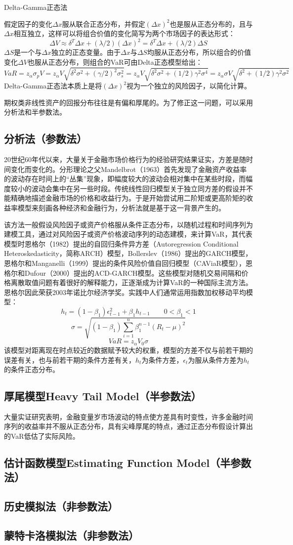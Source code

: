 \documentclass[UTF8]{ctexart}
\newcommand \qd[1] {\begin{qds} {#1} \end{qds}}
\begin{document}
\qd{Delta-Gamma正态法}假定因子的变化$\Delta x$服从联合正态分布，并假定$(\Delta x)^2$也是服从正态分布的，且与$\Delta x$相互独立，这样可以将组合价值的变化简写为两个市场因子的表达形式：
$$\Delta V \approx \delta^T \Delta x+(\lambda /2)(\Delta x)^2= \delta^T \Delta x+(\lambda /2)\Delta S$$
$\Delta S$是一个与$\Delta x$独立的正态变量。由于$\Delta x$与$\Delta S$均服从正态分布，所以组合的价值变化$\Delta V$也服从正态分布，则组合的VaR可由Delta正态模型给出：
$$VaR
=z_{\alpha} \sigma_p V
=z_{\alpha} V \sqrt{\delta^2 \sigma^2+(\gamma /2)^2 \sigma_s^2}
=z_{\alpha} V \sqrt{\delta^2 \sigma^2+(1/2)\gamma^2 \sigma^4}
=z_{\alpha} \sigma V \sqrt{\delta^2 +(1/2)\gamma^2 \sigma^2}$$
Delta-Gamma正态法本质上是将$(\Delta x)^2$视为一个独立的风险因子，以简化计算。

期权类非线性资产的回报分布往往是有偏和厚尾的。为了修正这一问题，可以采用分析法和半参数法。

\subsection{分析法（参数法）}
20世纪60年代以来，大量关于金融市场价格行为的经验研究结果证实，方差是随时间变化而变化的。分形理论之父Mandelbrot（1963）首先发现了金融资产收益率的波动存在时间上的“丛集”现象，即幅度较大的波动会相对集中在某些时段，而幅度较小的波动会集中在另一些时段。传统线性回归模型关于独立同方差的假设并不能精确地描述金融市场的价格和收益行为。于是开始尝试用二阶矩或更高阶矩的收益率模型来刻画各种经济和金融行为，分析法就是基于这一背景产生的。

该方法一般假设风险因子或资产价格服从条件正态分布，以随机过程和时间序列为建模工具，通过对风险因子或资产价格波动序列的动态建模，来计算VaR，其代表模型时恩格尔（1982）提出的自回归条件异方差（Autoregression Conditional Heteroskedasticity，简称ARCH）模型，Bollerslev（1986）提出的GARCH模型，恩格尔和Manganelli（1999）提出的条件风险价值自回归模型（CAViaR模型），恩格尔和Dufour（2000）提出的ACD-GARCH模型。这些模型对随机交易间隔和价格离散取值问题有着很好的解释能力，正逐渐成为计算VaR的一种国际主流方法。恩格尔因此荣获2003年诺比尔经济学奖。实践中人们通常运用指数加权移动平均模型：
$$h_t=(1-\beta_1)\epsilon_{t-1}^2+\beta_1 h_{t-1} \quad\quad 0<\beta_1<1$$
$$\sigma=\sqrt{(1-\beta_1)\sum\limits_{i=1}^n \beta_1^{n-1}(R_t-\mu)^2}$$
$$VaR=z_\alpha V_0 \sigma$$
该模型对距离现在时点较近的数据赋予较大的权重，模型的方差不仅与前若干期的误差有关，也与前若干期的条件方差有关，$h_t$为条件方差，$\epsilon_t$为服从条件方差为$h_t$的条件正态分布。
\subsection{厚尾模型Heavy Tail Model（半参数法）}
大量实证研究表明，金融变量岁市场波动的特点使方差具有时变性，许多金融时间序列的收益率并不服从正态分布，具有尖峰厚尾的特点，通过正态分布假设计算出的VaR低估了实际风险。
\subsection{估计函数模型Estimating Function Model（半参数法）}

\subsection{历史模拟法（非参数法）}

\subsection{蒙特卡洛模拟法（非参数法）}
\end{document}
